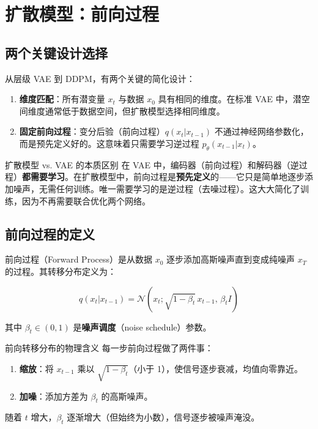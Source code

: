 \section{扩散模型：前向过程}

\subsection{两个关键设计选择}

从层级 VAE 到 DDPM，有两个关键的简化设计：

\begin{enumerate}
    \item \textbf{维度匹配}：所有潜变量 $x_t$ 与数据 $x_0$ 具有相同的维度。在标准 VAE 中，潜空间维度通常低于数据空间，但扩散模型选择相同维度。
    \item \textbf{固定前向过程}：变分后验（前向过程）$q(x_t|x_{t-1})$ 不通过神经网络参数化，而是预先定义好的。这意味着只需要学习逆过程 $p_\theta(x_{t-1}|x_t)$。
\end{enumerate}

\begin{importantbox}{扩散模型 vs. VAE 的本质区别}
在 VAE 中，编码器（前向过程）和解码器（逆过程）\textbf{都需要学习}。在扩散模型中，前向过程是\textbf{预先定义}的——它只是简单地逐步添加噪声，无需任何训练。唯一需要学习的是逆过程（去噪过程）。这大大简化了训练，因为不再需要联合优化两个网络。
\end{importantbox}

\subsection{前向过程的定义}

前向过程（Forward Process）是从数据 $x_0$ 逐步添加高斯噪声直到变成纯噪声 $x_T$ 的过程。其转移分布定义为：

$$q(x_t | x_{t-1}) = \mathcal{N}(x_t; \sqrt{1 - \beta_t} \, x_{t-1}, \, \beta_t I)$$

其中 $\beta_t \in (0, 1)$ 是\textbf{噪声调度}（noise schedule）参数。

\begin{importantbox}{前向转移分布的物理含义}
每一步前向过程做了两件事：
\begin{enumerate}
    \item \textbf{缩放}：将 $x_{t-1}$ 乘以 $\sqrt{1-\beta_t}$（小于 1），使信号逐步衰减，均值向零靠近。
    \item \textbf{加噪}：添加方差为 $\beta_t$ 的高斯噪声。
\end{enumerate}
随着 $t$ 增大，$\beta_t$ 逐渐增大（但始终为小数），信号逐步被噪声淹没。
\end{importantbox}

